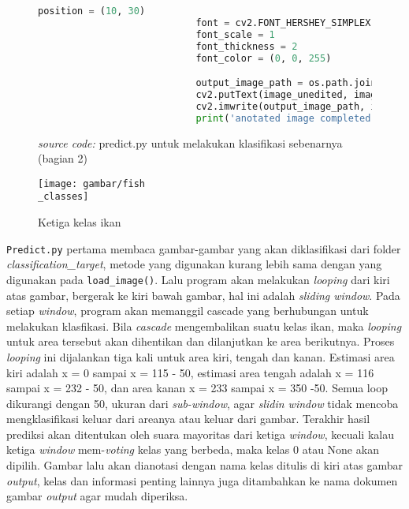 		\begin{figure}[H]
			\begin{lstlisting}[language=Python, basicstyle=\tiny]
							position = (10, 30)
							font = cv2.FONT_HERSHEY_SIMPLEX
							font_scale = 1
							font_thickness = 2
							font_color = (0, 0, 255)

							output_image_path = os.path.join('classification_results\\', os.path.splitext(filename)[0] + '.jpg')
							cv2.putText(image_unedited, image_class, position, font, font_scale, font_color, font_thickness)
							cv2.imwrite(output_image_path, image_unedited)
							print('anotated image completed!')
			\end{lstlisting}
			\caption{\emph{source code: } predict.py untuk melakukan klasifikasi sebenarnya (bagian 2)}
			\label{code: predict.py}
		\end{figure}

		\begin{figure}[H]
			\centering{}
			  \texttt{[image: gambar/fish\\\_classes]}
			\caption{Ketiga kelas ikan}
		\end{figure}

		\texttt{Predict.py} pertama membaca gambar-gambar yang akan diklasifikasi dari folder 
		\textit{classification\_target}, metode yang digunakan kurang lebih sama dengan 
		yang digunakan pada \texttt{load\_image()}. Lalu program akan melakukan \textit{looping} 
		dari kiri atas gambar, bergerak ke kiri bawah gambar, hal ini adalah \emph{sliding window}. 
		Pada setiap \emph{window}, program akan memanggil cascade yang berhubungan untuk melakukan klasfikasi. 
		Bila \emph{cascade} mengembalikan suatu kelas ikan, maka \textit{looping} untuk area tersebut 
		akan dihentikan dan dilanjutkan ke area berikutnya. Proses \textit{looping} ini dijalankan 
		tiga kali untuk area kiri, tengah dan kanan. Estimasi area kiri adalah x = 0 sampai x = 115 - 50, 
		estimasi area tengah adalah x = 116 sampai x = 232 - 50, dan area kanan x = 233 sampai x = 350 -50. 
		Semua loop dikurangi dengan 50, ukuran dari \emph{sub-window}, agar \textit{slidin window} tidak mencoba mengklasifikasi keluar dari 
		areanya atau keluar dari gambar. Terakhir hasil prediksi akan ditentukan oleh suara 
		mayoritas dari ketiga \textit{window}, kecuali kalau ketiga \emph{window} mem-\textit{voting} 
		kelas yang berbeda, maka kelas 0 atau None akan dipilih. Gambar lalu akan dianotasi dengan nama 
		kelas ditulis di kiri atas gambar \textit{output}, kelas dan informasi penting lainnya juga ditambahkan 
		ke nama dokumen gambar \textit{output} agar mudah diperiksa.

